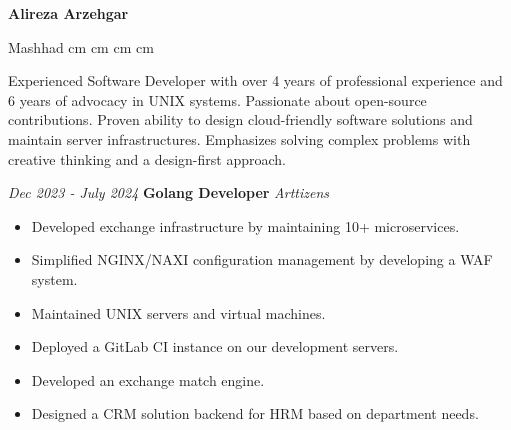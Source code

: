 \documentclass{engineercv}
\begin{document}
\begin{center}
  \textbf{\fontsize{24 pt}{24 pt}\selectfont Alireza Arzehgar}

  \vspace{0.2 cm}

  \scriptsize
  \mbox{{\color{black}\footnotesize\faMapMarker*}\hspace*{0.13cm}Mashhad}
   cm
  \mbox{}
   cm
  \mbox{}
   cm
  \mbox{}
   cm
  \mbox{}
\end{center}


Experienced Software Developer with over 4 years of professional experience and 6 years of advocacy in UNIX systems.
Passionate about open-source contributions. Proven ability to design cloud-friendly software solutions and
maintain server infrastructures. Emphasizes solving complex problems with creative thinking
and a design-first approach.


\begin{twocolentry}{\textit{Dec 2023 - July 2024}}
  \textbf{Golang Developer}
  \textit{Arttizens}
\end{twocolentry}

\begin{itemize}
  \item Developed exchange infrastructure by maintaining 10+ microservices.
  \item Simplified NGINX/NAXI configuration management by developing a WAF system.
  \item Maintained UNIX servers and virtual machines.
  \item Deployed a GitLab CI instance on our development servers.
  \item Developed an exchange match engine.
  \item Designed a CRM solution backend for HRM based on department needs.
\end{itemize}
\end{document}
